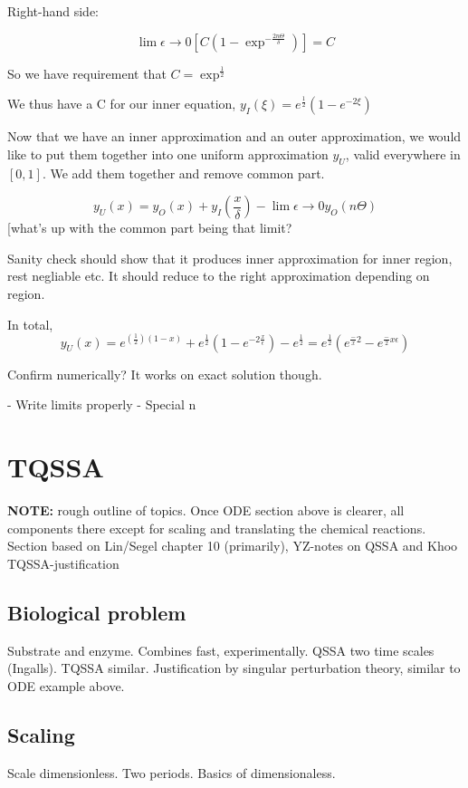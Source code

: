 \documentclass[12pt]{report}
\begin{document}
Right-hand side:

$$\lim \epsilon \to 0[C(1-\exp^{-\frac{2n \Theta}{\delta}})] = C$$

So we have requirement that $C = \exp^{\frac 1 2}$

We thus have a C for our inner equation, $y_I(\xi) = e^{\frac 1
2}(1-e^{-2\xi})$

Now that we have an inner approximation and an outer approximation, we would
like to put them together into one uniform approximation $y_U$, valid everywhere
in $[0,1]$. We add them together and remove common part.

$$y_U(x) = y_O(x) + y_I(\frac x \delta) - \lim \epsilon \to 0 y_O(n \Theta)$$
[what's up with the common part being that limit?

Sanity check should show that it produces inner approximation for inner region,
rest negliable etc. It should reduce to the right approximation depending on
region.

In total, $$y_U(x) = e^{(\frac 1 2)(1-x)} + e^{\frac 1 2}(1 - e^{-2\frac x
\epsilon}) - e^{\frac 1 2} = e^{\frac 1 2}(e^{\frac -x 2} - e^{\frac -2x
\epsilon})$$

Confirm numerically? It works on exact solution though.


- Write limits properly
- Special n

\chapter{TQSSA}

\textbf{NOTE:} rough outline of topics. Once ODE section above is clearer, all
components there except for scaling and translating the chemical reactions.
Section based on Lin/Segel chapter 10 (primarily), YZ-notes on QSSA and Khoo
TQSSA-justification

\section{Biological problem}

Substrate and enzyme. Combines fast, experimentally. QSSA two time scales
(Ingalls). TQSSA similar. Justification by singular perturbation theory, similar
to ODE example above.

\section{Scaling}

Scale dimensionless. Two periods. Basics of dimensionaless.
\end{document}
